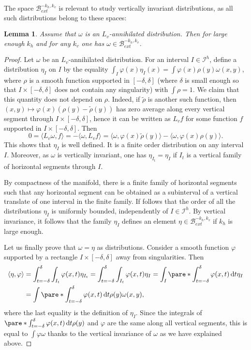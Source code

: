 \documentclass[11pt, a4paper, oneside, final, pagebackref]{amsart}
\newcommand{\boI}{\mathcal{I}}
\newcommand{\boB}{\mathcal{B}}
\newcommand{\dd}{\mathop{}\!\mathrm{d}}
\renewcommand{\phi}{\varphi}
\newtheorem{lem}[thm]{Lemma}
\theoremstyle{definition}
\numberwithin{equation}{section}
\begin{document}
The space $\boB^{-k_h, k_v}_{ext}$ is relevant to study vertically invariant
distributions, as all such distributions belong to these spaces:
\begin{lem}
\label{lem:all_Lvinv_in_boBext} Assume that $\omega$ is an $L_v$-annihilated
distribution. Then for large enough $k_h$ and for any $k_v$ one has $\omega
\in \boB^{-k_h, k_v}_{ext}$.
\end{lem}
\begin{proof}
Let $\omega$ be an $L_v$-annihilated distribution. For an interval $I \in
\boI^h$, define a distribution $\eta_I$ on $I$ by the equality $\int_I
\phi(x) \eta_I(x) = \int \phi(x) \rho(y) \omega(x,y)$, where $\rho$ is a
smooth function supported in $[-\delta,\delta]$ (where $\delta$ is small
enough so that $I \times [-\delta, \delta]$ does not contain any singularity)
with $\int \rho = 1$. We claim that this quantity does not depend on $\rho$.
Indeed, if $\tilde \rho$ is another such function, then $(x,y)\mapsto \phi(x)
(\rho(y)-\tilde \rho(y))$ has zero average along every vertical segment
through $I \times [-\delta, \delta]$, hence it can be written as $L_v f$ for
some function $f$ supported in $I \times [-\delta,\delta]$. Then
\begin{equation*}
  0 = \langle L_v \omega, f \rangle = - \langle \omega, L_v f \rangle
  = \langle \omega, \phi(x)\tilde \rho(y) \rangle - \langle \omega, \phi(x) \rho(y) \rangle.
\end{equation*}
This shows that $\eta_I$ is well defined. It is a finite order distribution
on any interval $I$. Moreover, as $\omega$ is vertically invariant, one has
$\eta_{I_t} = \eta_I$ if $I_t$ is a vertical family of horizontal segments
through $I$.

By compactness of the manifold, there is a finite family of horizontal
segments such that any horizontal segment can be obtained as a subinterval of
a vertical translate of one interval in the finite family. If follows that
the order of all the distributions $\eta_I$ is uniformly bounded,
independently of $I \in \boI^h$. By vertical invariance, it follows that the
family $\eta_I$ defines an element $\eta \in \boB^{-k_h, k_v}_{ext}$ if $k_h$
is large enough.

Let us finally prove that $\omega = \eta$ as distributions. Consider a smooth
function $\phi$ supported by a rectangle $I \times [-\delta, \delta]$ away
from singularities. Then
\begin{align*}
  \langle \eta, \phi \rangle
  &= \int_{t={-\delta}}^\delta \int_{I_t} \phi(x,t) \eta_{I_t}
  = \int_{t={-\delta}}^\delta \int_{I_t} \phi(x,t) \eta_I
  =\int_I \pare*{\int_{t={-\delta}}^\delta \phi(x,t) \dd t} \eta_I
  \\&=\int \pare*{\int_{t={-\delta}}^\delta \phi(x,t) \dd t} \rho(y) \omega(x,y),
\end{align*}
where the last equality is the definition of $\eta_I$. Since the integrals of
$\pare*{\int_{t={-\delta}}^\delta \phi(x,t) \dd t} \rho(y)$ and $\phi$ are
the same along all vertical segments, this is equal to $\int \phi \omega$
thanks to the vertical invariance of $\omega$ as we have explained above.


\end{proof}
\end{document}

